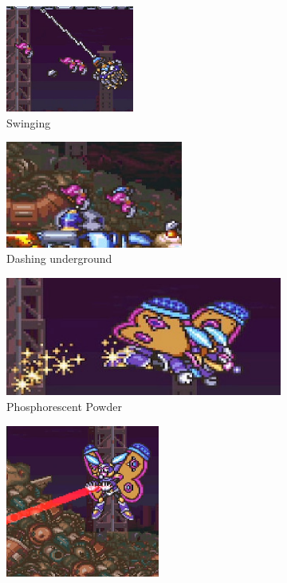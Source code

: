 \begin{figure}[htp]
	\centering
	\begin{subfigure}{0.4\linewidth}
		\centering
		\includegraphics[height=3.5cm]{figures/X2/Morph_moth/Moth_swing.jpg}
		\caption{Swinging}
	\end{subfigure}
	\begin{subfigure}{0.5\linewidth}
		\centering
		\includegraphics[height=3.5cm]{figures/X2/Morph_moth/Moth_underground.jpg}
		\caption{Dashing underground}
	\end{subfigure}
	\begin{subfigure}{0.4\linewidth}
		\centering
		\includegraphics[width=\linewidth]{figures/X2/Morph_moth/Moth_powder.jpg}
		\caption{Phosphorescent Powder}
	\end{subfigure}
	\begin{subfigure}{0.4\linewidth}
		\centering
		\includegraphics[height=5cm]{figures/X2/Morph_moth/Moth_beam.png}

\end{subfigure}
\end{figure}
